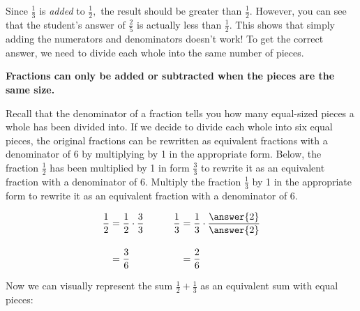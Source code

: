 \documentclass{ximera}
\begin{document}
Since $\textstyle \frac{1}{3}$ is \emph{added} to $\textstyle \frac{1}{2},$ the result should be greater than $\textstyle \frac{1}{2}.$
However, you can see that the student's answer of $\textstyle \frac{2}{5}$ is actually less than $\textstyle \frac{1}{2}.$
This shows that simply adding the numerators and denominators doesn't work!  To get the correct answer, we need to divide each whole into the
same number of pieces.


\begin{center}
\textbf{Fractions can only be added or subtracted when the pieces are the same size.}
\end{center}

Recall that the denominator of a fraction tells you how many equal-sized pieces a whole has been divided into.  If we decide to
divide each whole into six equal pieces, the original fractions can be rewritten as equivalent fractions with a denominator of 6 by
multiplying by 1 in the appropriate form.  Below, the fraction $\frac{1}{2}$ has been multiplied by 1 in form $\frac{3}{3}$ to rewrite it as
an equivalent fraction with a denominator of 6.  Multiply the fraction $\frac{1}{3}$ by 1 in the appropriate form to rewrite it as an equivalent 
fraction with a denominator of 6.


\begin{align*}
  \frac{1}{2} &= \frac{1}{2} \cdot \frac{3}{3} & \qquad \frac{1}{3} &= \frac{1}{3} \cdot \frac{ \answer{2} }{ \answer{2} } \\[10pt]
              &= \frac{3}{6}                   &  \qquad            &= \frac{2}{6}
              \end{align*}

Now we can visually represent the sum $\textstyle \frac{1}{2} + \frac{1}{3}$ as an equivalent sum with equal pieces:
\end{document}
